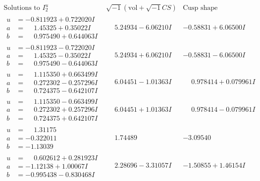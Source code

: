 \documentclass[1p]{elsarticle_modified}
\theoremstyle{definition}
\newcommand{\I}{\sqrt{-1}}
\begin{document}
$$\begin{array}{c|c|c}  
\text{Solutions to }I^u_{2}& \I (\text{vol} + \sqrt{-1}CS) & \text{Cusp shape}\\
 \hline 
\begin{aligned}
u &= -0.811923 + 0.722020 I \\
a &= \phantom{-}1.45325 + 0.35022 I \\
b &= \phantom{-}0.975490 + 0.644063 I\end{aligned}
 & \phantom{-}5.24934 - 6.06210 I & -0.58831 + 6.06500 I \\ \hline\begin{aligned}
u &= -0.811923 - 0.722020 I \\
a &= \phantom{-}1.45325 - 0.35022 I \\
b &= \phantom{-}0.975490 - 0.644063 I\end{aligned}
 & \phantom{-}5.24934 + 6.06210 I & -0.58831 - 6.06500 I \\ \hline\begin{aligned}
u &= \phantom{-}1.115350 + 0.663499 I \\
a &= \phantom{-}0.272302 - 0.257296 I \\
b &= \phantom{-}0.724375 - 0.642107 I\end{aligned}
 & \phantom{-}6.04451 - 1.01363 I & \phantom{-}0.978414 + 0.079961 I \\ \hline\begin{aligned}
u &= \phantom{-}1.115350 - 0.663499 I \\
a &= \phantom{-}0.272302 + 0.257296 I \\
b &= \phantom{-}0.724375 + 0.642107 I\end{aligned}
 & \phantom{-}6.04451 + 1.01363 I & \phantom{-}0.978414 - 0.079961 I \\ \hline\begin{aligned}
u &= \phantom{-}1.31175\phantom{ +0.000000I} \\
a &= -0.322011\phantom{ +0.000000I} \\
b &= -1.13039\phantom{ +0.000000I}\end{aligned}
 & \phantom{-}1.74489\phantom{ +0.000000I} & -3.09540\phantom{ +0.000000I} \\ \hline\begin{aligned}
u &= \phantom{-}0.602612 + 0.281923 I \\
a &= -1.12138 + 1.00067 I \\
b &= -0.995438 - 0.830468 I\end{aligned}
 & \phantom{-}2.28696 - 3.31057 I & -1.50855 + 1.46154 I \\ \hline\begin{aligned}

\end{aligned}
\end{array}$$
\end{document}
